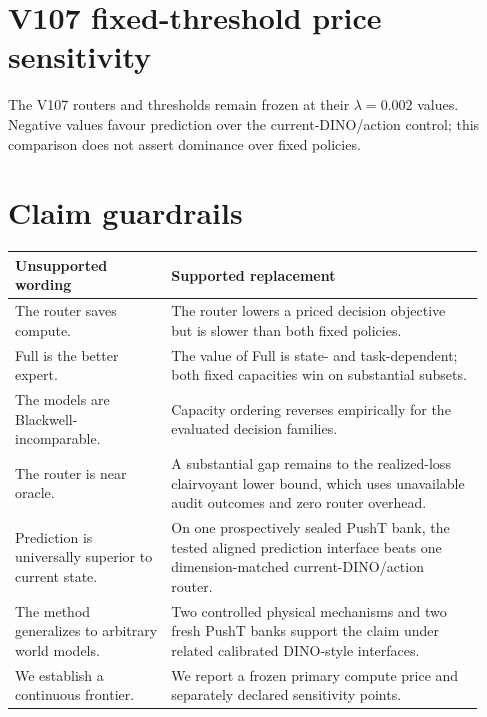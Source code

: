 \documentclass[10pt]{article}
\theoremstyle{definition}
\theoremstyle{remark}
\begin{document}
\section{V107 fixed-threshold price sensitivity}

\noindent The V107 routers and thresholds remain frozen at their
$\lambda=0.002$ values.  Negative values favour prediction over the
current-DINO/action control; this comparison does not assert dominance over
fixed policies.
\begin{center}
  \small
  
\end{center}

\section{Claim guardrails}

\begin{center}
\small
\begin{tabular}{
  >{\raggedright\arraybackslash}p{0.31\linewidth}
  >{\raggedright\arraybackslash}p{0.62\linewidth}}
\toprule
Unsupported wording & Supported replacement \\
\midrule
The router saves compute. &
The router lowers a priced decision objective but is slower than both fixed
policies. \\
Full is the better expert. &
The value of Full is state- and task-dependent; both fixed capacities win on
substantial subsets. \\
The models are Blackwell-incomparable. &
Capacity ordering reverses empirically for the evaluated decision families. \\
The router is near oracle. &
A substantial gap remains to the realized-loss clairvoyant lower bound, which
uses unavailable audit outcomes and zero router overhead. \\
Prediction is universally superior to current state. &
On one prospectively sealed PushT bank, the tested aligned prediction
interface beats one dimension-matched current-DINO/action router. \\
The method generalizes to arbitrary world models. &
Two controlled physical mechanisms and two fresh PushT banks support the claim
under related calibrated DINO-style interfaces. \\
We establish a continuous frontier. &
We report a frozen primary compute price and separately declared sensitivity
points. \\
\bottomrule
\end{tabular}
\end{center}
\end{document}
